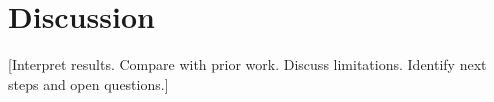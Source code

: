 \documentclass[11pt,a4paper]{article}
\begin{document}


\section{Discussion}

[Interpret results. Compare with prior work. Discuss limitations. Identify
next steps and open questions.]


\end{document}
